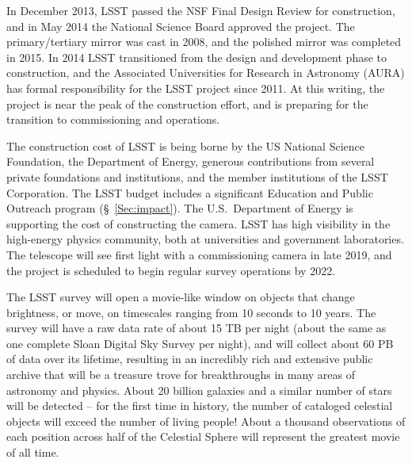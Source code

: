 In December 2013, LSST passed the NSF Final Design Review for construction,
and in May 2014 the National Science Board approved the project.
The primary/tertiary mirror was cast in 2008, and the polished mirror
was completed in 2015.
In 2014 LSST transitioned from the design and development phase to
construction, and the Associated Universities for Research in
Astronomy (AURA) has formal responsibility for the LSST project since 2011.  
At this writing,  the project is near the peak of the construction
effort, and is preparing for the transition to
commissioning and operations.

The construction cost of LSST is being borne by the US National Science
Foundation, the Department of Energy, generous contributions from several
private foundations and institutions, and the member institutions of the
LSST Corporation. The LSST budget includes a significant Education and
Public Outreach program (\S~\ref{Sec:impact}).
The U.S.\ Department of Energy is supporting the cost of constructing the
camera. LSST has high visibility in the high-energy physics community,
both at universities and government laboratories. The telescope will
see first light with a commissioning camera in late 2019, and the
project is scheduled to begin regular survey operations by 2022.

The LSST survey will open a movie-like window on objects that
change brightness, or move, on timescales ranging from 10 seconds to 10 years.
The survey will have a raw data rate of about 15 TB per night (about the same as one
complete Sloan Digital Sky Survey per night), and will collect about 60 PB
of data over its lifetime, resulting in an incredibly rich and extensive
public archive that will be a treasure trove for breakthroughs in many areas
of astronomy and physics. About 20 billion galaxies and a similar number of stars
will be detected -- for the first time in history, the number of cataloged
celestial objects will exceed the number of living people! About a thousand
observations of each position across half of the Celestial Sphere will
represent the greatest movie of all time.


